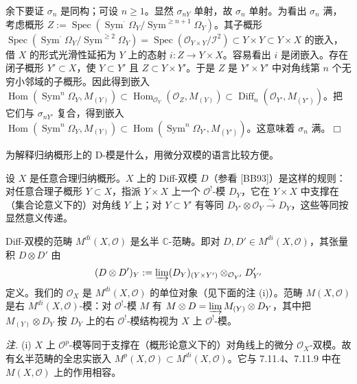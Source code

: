 余下要证 $\sigma_n$ 是同构；可设 $n\ge 1$。显然 $\sigma_{nY}$ 单射，故 $\sigma_n$ 单射。为看出 $\sigma_n$ 满，考虑概形 $Z:=\operatorname{Spec}(\operatorname{Sym}^\cdot\Omega_Y/\operatorname{Sym}^{\ge n+1}\Omega_Y)$。其子概形 $\operatorname{Spec}(\operatorname{Sym}^\cdot\Omega_Y/\operatorname{Sym}^{\ge 2}\Omega_Y)=\operatorname{Spec}(\mathcal{O}_{Y\times Y}/\mathcal{I}^2)\subset Y\times Y\subset Y\times X$ 的嵌入，借 $X$ 的形式光滑性延拓为 $Y$ 上的态射 $i:Z\to Y\times X$。容易看出 $i$ 是闭嵌入。存在闭子概形 $Y'\subset X$，使 $Y\subset Y'$ 且 $Z\subset Y\times Y'$。于是 $Z$ 是 $Y'\times Y'$ 中对角线第 $n$ 个无穷小邻域的子概形。因此得到嵌入 $\operatorname{Hom}(\operatorname{Sym}^n\Omega_Y,M_{(Y)})\subset\operatorname{Hom}_{\mathcal{O}_Y}(\mathcal{O}_Z,M_{(Y)})\subset\operatorname{Diff}_n(\mathcal{O}_{Y'},M_{(Y')})$。把它们与 $\sigma_{nY'}$ 复合，得到嵌入 $\operatorname{Hom}(\operatorname{Sym}^n\Omega_Y,M_{(Y)})\subset\operatorname{Hom}(\operatorname{Sym}^n\Omega_{Y'},M_{(Y')})$。这意味着 $\sigma_n$ 满。\hfill$\Box$

 为解释归纳概形上的 D-模是什么，用微分双模的语言比较方便。

设 $X$ 是任意合理归纳概形。$X$ 上的 Diff-双模 $D$（参看 [BB93]）是这样的规则：对任意合理子概形 $Y\subset X$，指派 $Y\times X$ 上一个 $\mathcal{O}^!$-模 $D_Y$，它在 $Y\times X$ 中支撑在（集合论意义下的）对角线 $Y$ 上；对 $Y\subset Y'$ 有等同 $D_{Y'}\otimes\mathcal{O}_Y\xrightarrow{\sim}D_Y$，这些等同按显然意义传递。

Diff-双模的范畴 $M^{di}(X,\mathcal{O})$ 是幺半 $\mathbb{C}$-范畴。即对 $D,D'\in M^{di}(X,\mathcal{O})$，其张量积 $D\otimes D'$ 由
\[
(D\otimes D')_Y:=\varinjlim(D_Y)_{(Y\times Y')}\otimes_{\mathcal{O}_{Y'}}D'_{Y'}
\]
定义。我们的 $\mathcal{O}_X$ 是 $M^{di}(X,\mathcal{O})$ 的单位对象（见下面的注 (i)）。范畴 $M(X,\mathcal{O})$ 是右 $M^{di}(X,\mathcal{O})$-模：对 $\mathcal{O}^!$-模 $M$ 有 $M\otimes D=\varinjlim M_{(Y)}\otimes D_Y$，其中把 $M_{(Y)}\otimes D_Y$ 按 $D_Y$ 上的右 $\mathcal{O}^!$-模结构视为 $X$ 上 $\mathcal{O}^!$-模。

\emph{注.} (i) $X$ 上 $\mathcal{O}^p$-模等同于支撑在（概形论意义下的）对角线上的微分 $\mathcal{O}_X$-双模。故有幺半范畴的全忠实嵌入 $M^p(X,\mathcal{O})\subset M^{di}(X,\mathcal{O})$。它与 7.11.4、7.11.9 中在 $M(X,\mathcal{O})$ 上的作用相容。

